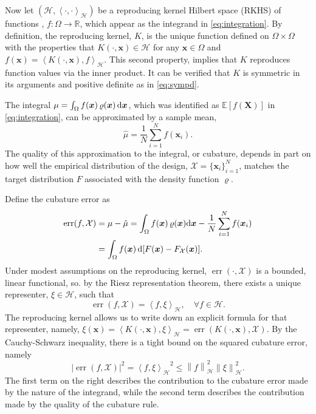 \documentclass[graybox]{svmult}
\newcommand{\vx}{\boldsymbol{x}}
\newcommand{\vX}{\boldsymbol{X}}
\newcommand{\dif}{{\rm d}}
\newcommand{\Xdes}{\mathcal{X}}
\newcommand{\ch}{\mathcal{H}}
\newcommand{\Ex}{\mathbb{E}}
\newcommand{\ip}[3][{}]{\ensuremath{\left \langle #2, #3 \right \rangle_{#1}}}
\newcommand{\norm}[2][{}]{\ensuremath{\left \lVert #2 \right \rVert}_{#1}}
\DeclareMathOperator{\err}{err}
\def\abs#1{\ensuremath{\left \lvert #1 \right \rvert}}
\begin{document}
Now let $(\ch, \ip[\ch]{\cdot}{\cdot})$ be a reproducing kernel Hilbert space (RKHS) of functions \cite{Aro50}, $f: \Omega \rightarrow \mathbb{R}$, which appear as the integrand in \eqref{eq:integration}. By definition, the reproducing kernel, $K$, is the unique function defined on $\Omega \times \Omega$ with the properties that $K(\cdot, \vx)\in \ch$ for any $\vx \in \Omega$ and $f(\vx)=\ip[\ch]{K(\cdot,\vx)}{f}$.  This second property, implies that $K$ reproduces function values via the inner product. It can be verified that $K$ is symmetric in its arguments and positive definite as in \eqref{eq:sympd}.

The integral $\mu = \int_{\Omega} f(\vx) \, \varrho(\vx) \, \dif \vx$, which was identified as $\Ex[f(\vX)]$ in \eqref{eq:integration}, can be approximated by a sample mean, 
\begin{equation}\label{eq:cubature}
\hat{\mu}=\frac{1}{N}\sum_{i=1}^N f(\vx_i).
\end{equation}
The quality of this approximation to the integral, or cubature, depends in part on how well the empirical distribution of the design, $\Xdes = \{\vx_i\}_{i=1}^N$, matches the target distribution $F$ associated with the density function $\varrho$. 

Define the cubature error as  
\begin{align}
\nonumber 
\err(f,\Xdes) & = \mu - \hat{\mu} = \int_{\Omega} f(\vx)\, \varrho(\vx) \dif \vx -\frac{1}{N}\sum_{i=1}^N f(\vx_i) \\
& =\int_\Omega f(\vx) \, \dif[F(\vx)-F_{\Xdes}(\vx)]. \label{eq:err}
\end{align}
Under modest assumptions on the reproducing kernel,  $\err(\cdot, \Xdes)$ is a bounded, linear functional, so. 
by the Riesz representation theorem, there exists a unique representer, $\xi \in \ch$, such that 
\[
\err(f, \Xdes)=\ip[\ch]{f}{\xi}, \quad \forall f\in \ch.
\]
The reproducing kernel allows us to write down an explicit formula for that representer, namely, $\xi(\vx)=\ip[\ch]{K(\cdot,\vx)}{\xi}=\err(K(\cdot,\vx),\Xdes)$.
By the Cauchy-Schwarz inequality, there is a tight bound on the squared cubature error, namely
\begin{equation}\label{eq:wcErrA}
\abs{\err(f,\Xdes)}^2=\ip[\ch]{f}{\xi}^2\leq \norm[\ch]{f}^2 \norm[\ch]{\xi}^2.
\end{equation}
The first term on the right describes the contribution to the cubature error made by the nature of the integrand, while the second term describes the contribution made by the quality of the cubature rule.
\end{document}
